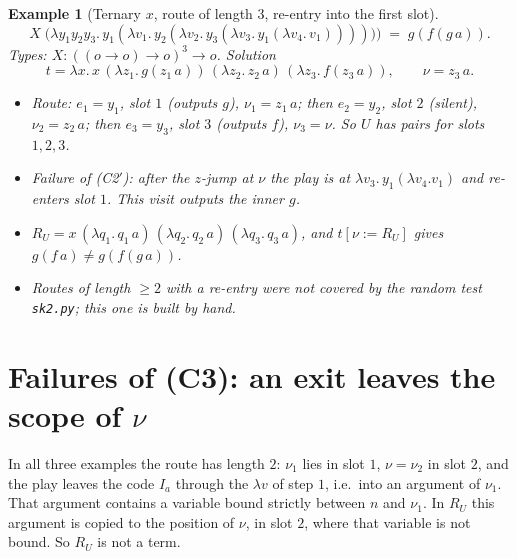 \documentclass[11pt]{article}
\newtheorem{example}{Example}
\begin{document}
\begin{example}[Ternary $x$, route of length 3, re-entry into the first slot]\label{ex:c2c}
\[
X\;\bigl(\lambda y_1y_2y_3.\,y_1(\lambda v_1.\,y_2(\lambda v_2.\,y_3(\lambda v_3.\,y_1(\lambda v_4.\,v_1)))))\bigr)\;=\;g(f(g\,a)).
\]
Types: $X:((o\to o)\to o)^3\to o$.  Solution
\[
t=\lambda x.\,x\,(\lambda z_1.\,g(z_1\,a))\,(\lambda z_2.\,z_2\,a)\,(\lambda z_3.\,f(z_3\,a)),
\qquad \nu=z_3\,a .
\]
\begin{itemize}
\item Route: $e_1=y_1$, slot $1$ (outputs $g$), $\nu_1=z_1\,a$; then
  $e_2=y_2$, slot $2$ (silent), $\nu_2=z_2\,a$; then $e_3=y_3$, slot $3$
  (outputs $f$), $\nu_3=\nu$.  So $U$ has pairs for slots $1,2,3$.
\item Failure of (C2$'$): after the $z$-jump at $\nu$ the play is at
  $\lambda v_3.\,y_1(\lambda v_4.v_1)$ and re-enters slot $1$.  This visit
  outputs the inner $g$.
\item $R_U=x\,(\lambda q_1.\,q_1\,a)\,(\lambda q_2.\,q_2\,a)\,(\lambda q_3.\,q_3\,a)$,
  and $t[\nu:=R_U]$ gives $g(f\,a)\neq g(f(g\,a))$.
\item Routes of length $\ge2$ with a re-entry were not covered by the
  random test \texttt{sk2.py}; this one is built by hand.
\end{itemize}
\end{example}

\section{Failures of (C3): an exit leaves the scope of $\nu$}

In all three examples the route has length $2$: $\nu_1$ lies in slot
$1$, $\nu=\nu_2$ in slot $2$, and the play leaves the code $I_a$ through
the $\lambda v$ of step $1$, i.e.\ into an argument of $\nu_1$.  That
argument contains a variable bound strictly between $n$ and $\nu_1$.  In
$R_U$ this argument is copied to the position of $\nu$, in slot $2$,
where that variable is not bound.  So $R_U$ is not a term.
\end{document}
